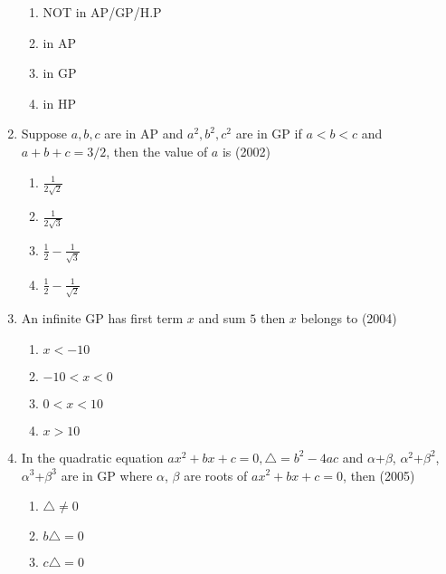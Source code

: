 \begin{enumerate}[label=\thesubsection.\arabic*,ref=\thesubsection.\theenumi]
    \begin{multicols}{2}
\begin{enumerate}    
        \item NOT in AP/GP/H.P
        \item in AP
        \item in GP
        \item  in HP
        \end{enumerate}
\end{multicols}
\item Suppose $a, b, c$ are in AP and $a^2, b^2, c^2$ are in GP if $a<b<c$ and $a+b+c=3/2$,  then the value of $a$ is \hfill(2002)
            \begin{multicols}{4}
\begin{enumerate}    
             \item $\frac{1}{2\sqrt{2}}$
             \item $\frac{1}{2\sqrt{3}}$
             \item $\frac{1}{2}-\frac{1}{\sqrt{3}}$
             \item $\frac{1}{2}-\frac{1}{\sqrt{2}}$
            \end{enumerate}
            \end{multicols}
\item An infinite GP has first term $x$ and sum $5$ then $x$ belongs to \hfill(2004)
            \begin{multicols}{4}
\begin{enumerate}    
                \item $x<-10$
                \item $-10<x<0$
                \item $0<x<10$
                \item $x>10$
                \end{enumerate}
                \end{multicols}
\item In the quadratic equation $ax^2+bx+c=0, \triangle=b^2-4ac$ and $\alpha$+$\beta$, $\alpha^2$+$\beta^2$, $\alpha^3$+$\beta^3$ are in GP where $\alpha$, $\beta $ are roots of $ax^2+bx+c=0$, then \hfill(2005)
                \begin{multicols}{4}
\begin{enumerate}    
                    \item $\triangle\neq0$
                    \item $b\triangle=0$
                    \item $c\triangle=0$

\end{enumerate}
\end{multicols}
\end{enumerate}
